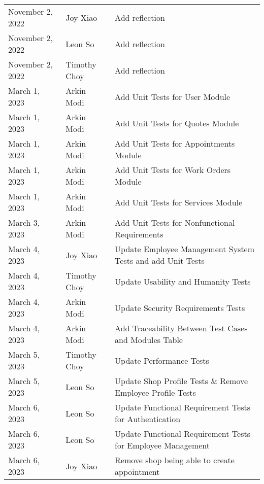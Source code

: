 \documentclass[12pt, titlepage]{article}
\begin{document}
\begin{longtable}{p{} p{} p{}}
	November 2, 2022 & Joy Xiao              & Add reflection                                              \\
	November 2, 2022 & Leon So               & Add reflection                                              \\
	November 2, 2022 & Timothy Choy          & Add reflection                                              \\
	March 1, 2023    & Arkin Modi            & Add Unit Tests for User Module                              \\
	March 1, 2023    & Arkin Modi            & Add Unit Tests for Quotes Module                            \\
	March 1, 2023    & Arkin Modi            & Add Unit Tests for Appointments Module                      \\
	March 1, 2023    & Arkin Modi            & Add Unit Tests for Work Orders Module                       \\
	March 1, 2023    & Arkin Modi            & Add Unit Tests for Services Module                          \\
	March 3, 2023    & Arkin Modi            & Add Unit Tests for Nonfunctional Requirements               \\
	March 4, 2023    & Joy Xiao              & Update Employee Management System Tests and add Unit Tests  \\
	March 4, 2023    & Timothy Choy          & Update Usability and Humanity Tests                         \\
	March 4, 2023    & Arkin Modi            & Update Security Requirements Tests                          \\
	March 4, 2023    & Arkin Modi            & Add Traceability Between Test Cases and Modules Table       \\
	March 5, 2023    & Timothy Choy          & Update Performance Tests                                    \\
	March 5, 2023    & Leon So               & Update Shop Profile Tests \& Remove Employee Profile Tests  \\
	March 6, 2023    & Leon So               & Update Functional Requirement Tests for Authentication      \\
	March 6, 2023    & Leon So               & Update Functional Requirement Tests for Employee Management \\
	March 6, 2023    & Joy Xiao              & Remove shop being able to create appointment                \\

\end{longtable}
\end{document}
